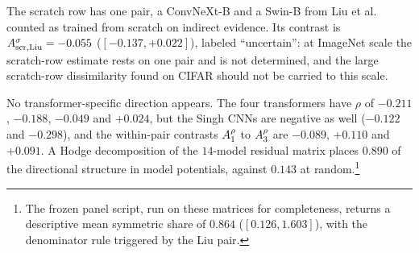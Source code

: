 The scratch row has one pair, a ConvNeXt-B and a Swin-B from Liu et al.~\cite{liu2023comprehensive} counted as trained from scratch on indirect evidence. Its contrast is $A^{\sigma}_{\mathrm{scr,Liu}} = -0.055$ ($[-0.137, +0.022]$), labeled ``uncertain'': at ImageNet scale the scratch-row estimate rests on one pair and is not determined, and the large scratch-row dissimilarity found on CIFAR should not be carried to this scale.

No transformer-specific direction appears. The four transformers have $\rho$ of $-0.211$, $-0.188$, $-0.049$ and $+0.024$, but the Singh CNNs are negative as well ($-0.122$ and $-0.298$), and the within-pair contrasts $A^{\rho}_{1}$ to $A^{\rho}_{3}$ are $-0.089$, $+0.110$ and $+0.091$. A Hodge decomposition of the $14$-model residual matrix places $0.890$ of the directional structure in model potentials, against $0.143$ at random.\footnote{The frozen panel script, run on these matrices for completeness, returns a descriptive mean symmetric share of $0.864$ ($[0.126, 1.603]$), with the denominator rule triggered by the Liu pair.}

